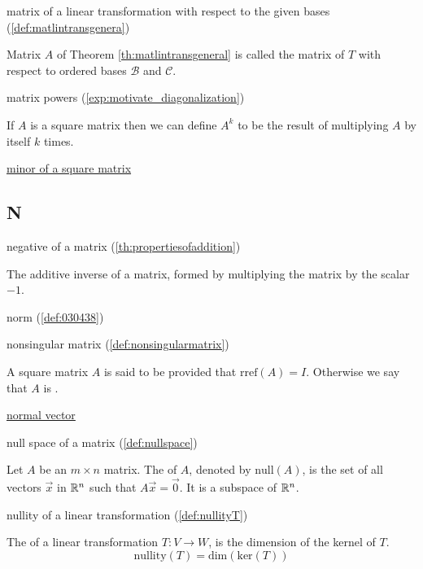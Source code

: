 \documentclass{ximera}
\begin{document}
matrix of a linear transformation with respect to the given bases (\ref{def:matlintransgenera})
\begin{expandable}
    Matrix $A$ of Theorem \ref{th:matlintransgeneral} is called the matrix of $T$ with respect to ordered bases $\mathcal{B}$ and $\mathcal{C}$.
\end{expandable}

matrix powers (\ref{exp:motivate_diagonalization})
\begin{expandable}
    If $A$ is a square matrix then we can define $A^k$ to be the result of multiplying $A$ by itself $k$ times.
\end{expandable}

\href{https://ximera.osu.edu/oerlinalg/LinearAlgebra/DET-0010/main}{minor of a square matrix}

\subsection{N}

negative of a matrix
(\ref{th:propertiesofaddition})
\begin{expandable}
    The additive inverse of a matrix, formed by multiplying the matrix by the scalar $-1$.
\end{expandable}


norm (\ref{def:030438})


nonsingular matrix (\ref{def:nonsingularmatrix})
\begin{expandable}
    A square matrix $A$ is said to be  provided that $\mbox{rref}(A)=I$.  Otherwise we say that $A$ is .
\end{expandable}

\href{https://ximera.osu.edu/oerlinalg/LinearAlgebra/RRN-0030/main}{normal vector}

null space of a matrix (\ref{def:nullspace})
\begin{expandable}
    Let $A$ be an $m\times n$ matrix.  The  of $A$, denoted by $\mbox{null}(A)$, is the set of all vectors $\vec{x}$ in $\mathbb{R}^n$ such that $A\vec{x}=\vec{0}$.   
    It is a subspace of $\mathbb{R}^n$.
\end{expandable}

nullity of a linear transformation (\ref{def:nullityT})
\begin{expandable}
    The  of a linear transformation $T:V\rightarrow W$, is the dimension of the kernel of $T$.
$$\mbox{nullity}(T)=\mbox{dim}(\mbox{ker}(T))$$
\end{expandable}
\end{document}
